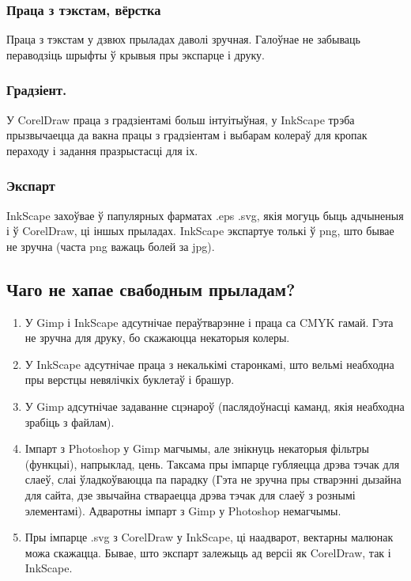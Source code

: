 \documentclass[10pt, a5paper]{article}
\begin{document}
\subsubsection*{Праца з тэкстам, вёрстка}

Праца з тэкстам у дзвюх прыладах даволі зручная. Галоўнае не забываць пераводзіць шрыфты ў крывыя пры экспарце і друку.

\subsubsection*{Градзіент.}

У CorelDraw праца з градзіентамі больш інтуітыўная, у InkScape трэба прызвычаецца да вакна працы з градзіентам і выбарам колераў для кропак пераходу і задання празрыстасці для іх.

\subsubsection*{Экспарт}

InkScape захоўвае ў папулярных фарматах .eps .svg, якія могуць быць адчыненыя і ў CorelDraw, ці іншых прыладах.
InkScape экспартуе толькі ў png, што бывае не зручна (часта png важаць болей за jpg).



\subsection*{Чаго не хапае свабодным прыладам?}

\begin{enumerate}
  \item У Gimp і InkScape адсутнічае пераўтварэнне і праца са CMYK гамай. Гэта не зручна для друку, бо скажаюцца некаторыя колеры.
  \item У InkScape адсутнічае праца з некалькімі старонкамі, што вельмі неабходна пры верстцы невялічкіх буклетаў і брашур.
  \item У Gimp адсутнічае задаванне сцэнароў (паслядоўнасці каманд, якія неабходна зрабіць з файлам).
  \item Імпарт з Photoshop у Gimp магчымы, але знікнуць некаторыя фільтры (функцыі), напрыклад, цень. Таксама пры імпарце губляецца дрэва тэчак для слаеў, слаі ўладкоўваюцца па парадку (Гэта не зручна пры стварэнні дызайна для сайта, дзе звычайна ствараецца дрэва тэчак для слаеў з рознымі элементамі).
Адваротны імпарт з Gimp у Photoshop немагчымы.
  \item Пры імпарце .svg з CorelDraw у InkScape, ці наадварот, вектарны малюнак можа скажацца. Бывае, што экспарт залежыць ад версіі як CorelDraw, так і InkScape.
\end{enumerate}
\end{document}
